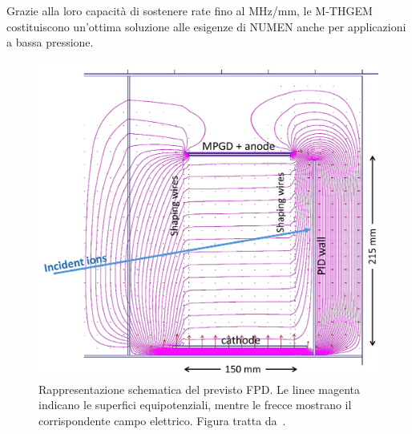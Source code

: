 Grazie alla loro capacità di sostenere rate fino al MHz/mm, le M-THGEM costituiscono un'ottima soluzione alle esigenze di NUMEN anche per applicazioni a bassa pressione.


\begin{figure} [!p]
	\centering
	\includegraphics[scale=0.3]{Grafici/nuovo_fpd.png}
	\caption{Rappresentazione schematica del previsto FPD. Le linee magenta indicano le superfici equipotenziali, mentre le frecce mostrano il corrispondente campo elettrico. Figura tratta da~\cite{cappuzzello:epja18}.} \label{fig:nuovo_fpd}
\end{figure}


